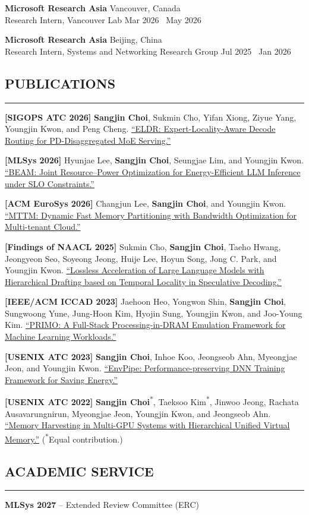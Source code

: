 \documentclass[10pt,a4paper]{article}
\newcommand{\cvsection}[1]{
  \subsection*{#1}
  \vspace{1.5mm}
  \hrule
  \vspace{0.5mm}
}
\begin{document}
\noindent
\textbf{Microsoft Research Asia} \hfill Vancouver, Canada\\
\hspace*{12pt}Research Intern, Vancouver Lab \hfill Mar 2026 \textendash\ May 2026

\noindent
\textbf{Microsoft Research Asia} \hfill Beijing, China\\
\hspace*{12pt}Research Intern, Systems and Networking Research Group \hfill Jul 2025 \textendash\ Jan 2026

\cvsection{PUBLICATIONS}

\begin{enumerate}[label={[\arabic*]},leftmargin=*,labelsep=0.6em,itemsep=3pt,parsep=0pt,topsep=0pt]
  \item \textbf{[SIGOPS ATC 2026]} \textbf{Sangjin Choi}, Sukmin Cho, Yifan Xiong, Ziyue Yang, Youngjin Kwon, and Peng Cheng. \href{https://arxiv.org/abs/2607.00466}{``ELDR: Expert-Locality-Aware Decode Routing for PD-Disaggregated MoE Serving.''}
  \item \textbf{[MLSys 2026]} Hyunjae Lee, \textbf{Sangjin Choi}, Seungjae Lim, and Youngjin Kwon. \href{https://proceedings.mlsys.org/paper_files/paper/2026/hash/eb3c42ddfa16d8421fdba13528107cc1-Abstract-Conference.html}{``BEAM: Joint Resource--Power Optimization for Energy-Efficient LLM Inference under SLO Constraints.''}
  \item \textbf{[ACM EuroSys 2026]} Changjun Lee, \textbf{Sangjin Choi}, and Youngjin Kwon. \href{https://dl.acm.org/doi/abs/10.1145/3767295.3769371}{``MTTM: Dynamic Fast Memory Partitioning with Bandwidth Optimization for Multi-tenant Cloud.''}
  \item \textbf{[Findings of NAACL 2025]} Sukmin Cho, \textbf{Sangjin Choi}, Taeho Hwang, Jeongyeon Seo, Soyeong Jeong, Huije Lee, Hoyun Song, Jong C. Park, and Youngjin Kwon. \href{https://aclanthology.org/2025.findings-naacl.216/}{``Lossless Acceleration of Large Language Models with Hierarchical Drafting based on Temporal Locality in Speculative Decoding.''}
  \item \textbf{[IEEE/ACM ICCAD 2023]} Jaehoon Heo, Yongwon Shin, \textbf{Sangjin Choi}, Sungwoong Yune, Jung-Hoon Kim, Hyojin Sung, Youngjin Kwon, and Joo-Young Kim. \href{https://ieeexplore.ieee.org/document/10323637}{``PRIMO: A Full-Stack Processing-in-DRAM Emulation Framework for Machine Learning Workloads.''}
  \item \textbf{[USENIX ATC 2023]} \textbf{Sangjin Choi}, Inhoe Koo, Jeongseob Ahn, Myeongjae Jeon, and Youngjin Kwon. \href{https://www.usenix.org/conference/atc23/presentation/choi}{``EnvPipe: Performance-preserving DNN Training Framework for Saving Energy.''}
  \item \textbf{[USENIX ATC 2022]} \textbf{Sangjin Choi}\textsuperscript{*}, Taeksoo Kim\textsuperscript{*}, Jinwoo Jeong, Rachata Ausavarungnirun, Myeongjae Jeon, Youngjin Kwon, and Jeongseob Ahn. \href{https://www.usenix.org/conference/atc22/presentation/choi-sangjin}{``Memory Harvesting in Multi-GPU Systems with Hierarchical Unified Virtual Memory.''} (\textsuperscript{*}Equal contribution.)
\end{enumerate}

\cvsection{ACADEMIC SERVICE}

\noindent
\textbf{MLSys 2027} -- Extended Review Committee (ERC)
\end{document}
